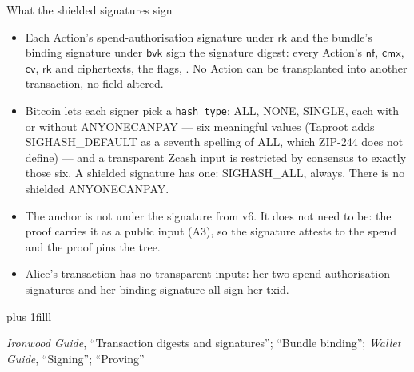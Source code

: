 \documentclass[aspectratio=169,11pt]{beamer}
\newcommand{\nfsym}{\ensuremath{\mathsf{nf}}}
\newcommand{\cmx}{\ensuremath{\mathsf{cmx}}}
\newcommand{\cvsym}{\ensuremath{\mathsf{cv}}}
\newcommand{\rksym}{\ensuremath{\mathsf{rk}}}
\newcommand{\src}[1]{\par\vskip0pt plus 1filll
  {\fontsize{6}{7.2}\selectfont\color{arbdim}\raggedright #1\par}}
\begin{document}
\begin{frame}{What the shielded signatures sign}
\small
\begin{itemize}
  \item Each Action's spend-authorisation signature under \rksym{} and
    the bundle's binding signature under $\mathsf{bvk}$ sign the
    signature digest: every Action's $\nfsym$, $\cmx$, $\cvsym$,
    $\rksym$ and ciphertexts, the flags, \Hvb. No Action can be
    transplanted into another transaction, no field altered.
  \item Bitcoin lets each signer pick a \texttt{hash\_type}: ALL, NONE,
    SINGLE, each with or without ANYONECANPAY --- six meaningful values
    (Taproot adds SIGHASH\_DEFAULT as a seventh spelling of ALL, which
    ZIP-244 does not define) --- and a transparent Zcash input is
    restricted by consensus to exactly those six. A shielded signature
    has one: SIGHASH\_ALL, always. There is no shielded ANYONECANPAY.
  \item The anchor is not under the signature from v6. It does not need
    to be: the proof carries it as a public input (A3), so the
    signature attests to the spend and the proof pins the tree.
  \item Alice's transaction has no transparent inputs: her two
    spend-authorisation signatures and her binding signature all sign
    her txid.
\end{itemize}
\src{\emph{Ironwood Guide}, ``Transaction digests and signatures''; ``Bundle
  binding''; \emph{Wallet Guide}, ``Signing''; ``Proving''}
\end{frame}
\end{document}
